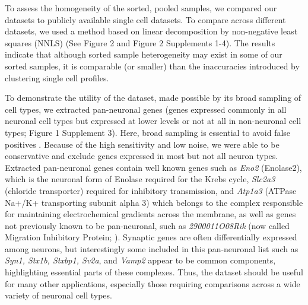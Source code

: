To assess the homogeneity of the sorted, pooled samples, we compared our datasets to publicly available single cell datasets. To compare across different datasets, we used a method based on linear decomposition by non-negative least squares (NNLS) (See Figure 2 and Figure 2 Supplements 1-4). The results indicate that although sorted sample heterogeneity may exist in some of our sorted samples, it is comparable (or smaller) than the inaccuracies introduced by clustering single cell profiles.

To demonstrate the utility of the dataset, made possible by its broad sampling of cell types, we extracted pan-neuronal genes (genes expressed commonly in all neuronal cell types but expressed at lower levels or not at all in non-neuronal cell types; Figure 1 Supplement 3). Here, broad sampling is essential to avoid false positives \citep{Zhang_2014,Mo_2015,Stefanakis_2015}. Because of the high sensitivity and low noise, we were able to be conservative and exclude genes expressed in most but not all neuron types. Extracted pan-neuronal genes contain well known genes such as \textit{Eno2} (Enolase2), which is the neuronal form of Enolase required for the Krebs cycle, \textit{Slc2a3} (chloride transporter) required for inhibitory transmission, and \textit{Atp1a3} (ATPase Na+/K+ transporting subunit alpha 3) which belongs to the complex responsible for maintaining electrochemical gradients across the membrane, as well as genes not previously known to be pan-neuronal, such as \textit{2900011O08Rik} (now called Migration Inhibitory Protein; \cite{Zhang_2014a}). Synaptic genes are often differentially expressed among neurons, but interestingly some included in this pan-neuronal list such as \textit{Syn1, Stx1b, Stxbp1, Sv2a}, and \textit{Vamp2} appear to be common components, highlighting essential parts of these complexes. Thus, the dataset should be useful for many other applications, especially those requiring comparisons across a wide variety of neuronal cell types. 

